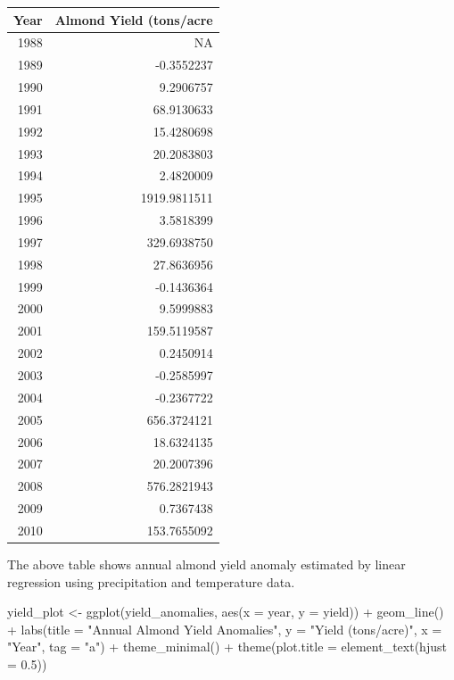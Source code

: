 \documentclass[
]{article}
\newenvironment{Shaded}{\begin{snugshade}}{\end{snugshade}}
\newcommand{\AttributeTok}[1]{\textcolor[rgb]{0.77,0.63,0.00}{#1}}
\newcommand{\FloatTok}[1]{\textcolor[rgb]{0.00,0.00,0.81}{#1}}
\newcommand{\FunctionTok}[1]{\textcolor[rgb]{0.00,0.00,0.00}{#1}}
\newcommand{\NormalTok}[1]{#1}
\newcommand{\OtherTok}[1]{\textcolor[rgb]{0.56,0.35,0.01}{#1}}
\newcommand{\SpecialCharTok}[1]{\textcolor[rgb]{0.00,0.00,0.00}{#1}}
\newcommand{\StringTok}[1]{\textcolor[rgb]{0.31,0.60,0.02}{#1}}
\begin{document}
\begin{table}
\centering
\begin{tabular}{r|r}
\hline
Year & Almond Yield (tons/acre\\
\hline
1988 & NA\\
\hline
1989 & -0.3552237\\
\hline
1990 & 9.2906757\\
\hline
1991 & 68.9130633\\
\hline
1992 & 15.4280698\\
\hline
1993 & 20.2083803\\
\hline
1994 & 2.4820009\\
\hline
1995 & 1919.9811511\\
\hline
1996 & 3.5818399\\
\hline
1997 & 329.6938750\\
\hline
1998 & 27.8636956\\
\hline
1999 & -0.1436364\\
\hline
2000 & 9.5999883\\
\hline
2001 & 159.5119587\\
\hline
2002 & 0.2450914\\
\hline
2003 & -0.2585997\\
\hline
2004 & -0.2367722\\
\hline
2005 & 656.3724121\\
\hline
2006 & 18.6324135\\
\hline
2007 & 20.2007396\\
\hline
2008 & 576.2821943\\
\hline
2009 & 0.7367438\\
\hline
2010 & 153.7655092\\
\hline
\end{tabular}
\end{table}

The above table shows annual almond yield anomaly estimated by linear
regression using precipitation and temperature data.

\begin{Shaded}
\begin{Highlighting}[]
\NormalTok{yield\_plot }\OtherTok{\textless{}{-}} \FunctionTok{ggplot}\NormalTok{(yield\_anomalies, }\FunctionTok{aes}\NormalTok{(}\AttributeTok{x =}\NormalTok{ year, }\AttributeTok{y =}\NormalTok{ yield)) }\SpecialCharTok{+}
  \FunctionTok{geom\_line}\NormalTok{() }\SpecialCharTok{+}
  \FunctionTok{labs}\NormalTok{(}\AttributeTok{title =} \StringTok{"Annual Almond Yield Anomalies"}\NormalTok{, }\AttributeTok{y =} \StringTok{"Yield (tons/acre)"}\NormalTok{, }\AttributeTok{x =} \StringTok{"Year"}\NormalTok{, }\AttributeTok{tag =} \StringTok{"a"}\NormalTok{) }\SpecialCharTok{+}
  \FunctionTok{theme\_minimal}\NormalTok{() }\SpecialCharTok{+}
  \FunctionTok{theme}\NormalTok{(}\AttributeTok{plot.title =} \FunctionTok{element\_text}\NormalTok{(}\AttributeTok{hjust =} \FloatTok{0.5}\NormalTok{))}
\end{Highlighting}
\end{Shaded}
\end{document}
